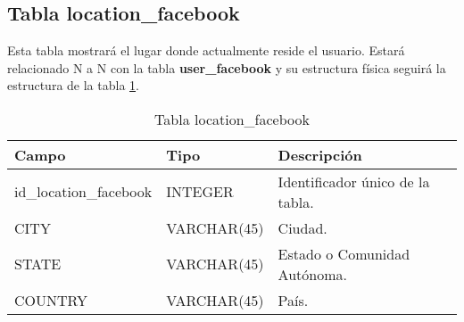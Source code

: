 \subsection{Tabla location\_facebook}
Esta tabla mostrará el lugar donde actualmente reside el usuario. Estará relacionado N a N con la tabla \textbf{user\_facebook} y su estructura física seguirá la estructura de la tabla \ref{tabLocationFacebook}.
\bigskip
\par
\begin{table}[H]
\begin{center}
\begin{tabular}{| l | l | p{60mm} |}\hline
\textbf{Campo}&\textbf{Tipo}&\textbf{Descripción} \\ \hline
id\_location\_facebook & INTEGER & Identificador único de la tabla. \\ \hline
CITY & VARCHAR(45) & Ciudad. \\ \hline
STATE & VARCHAR(45) & Estado o Comunidad Autónoma. \\ \hline
COUNTRY & VARCHAR(45) & País. \\ \hline
\end{tabular}
\end{center}
\caption{Tabla location\_facebook} \label{tabLocationFacebook}
\end{table}